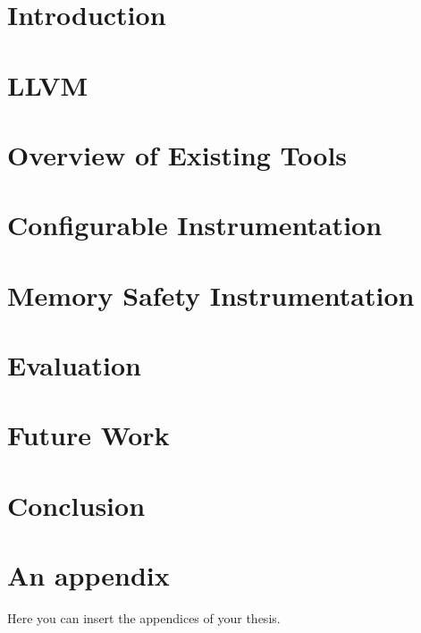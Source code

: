 \documentclass[
  digital, %
  notable,   %
  nolof,     %
  nolot,     %
  nocover
]{fithesis3}
\begin{document}
\chapter{Introduction}


\chapter{LLVM}\label{chap:llvm}


\chapter{Overview of Existing Tools}\label{chap:tools}


\chapter{Configurable Instrumentation}\label{chap:instr}


\chapter{Memory Safety Instrumentation}\label{chap:memsafety}


\chapter{Evaluation}\label{chap:eval}


\chapter{Future Work}\label{chap:future}


\chapter{Conclusion}\label{chap:conclusion}


\printbibliography

\appendix %
\chapter{An appendix}
Here you can insert the appendices of your thesis.
\end{document}
